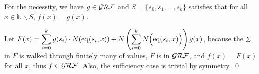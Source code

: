 
\begin{pf} \rm
 For the necessity, we have $g\in\mathcal{GRF}$ and
 $S=\{s_0,s_1,\ldots,s_k\}$ satisfies that
 for all $x\in\mathbb{N}\mathop{\backslash} S$, $f(x) = g(x)$.
 
 Let $\displaystyle F(x) = \sum_{i=0}^{k} g(s_i)\cdot N(\mathrm{eq}(s_i, x))
 + N\left( \sum_{i=0}^{k} N\Big(\mathrm{eq}(s_i, x)\Big) \right) g(x)$,
 because the $\Sigma$ in $F$ is walked through finitely many of values,
 $F$ is in $\mathcal{GRF}$, and $f(x)=F(x)$ for all $x$, thus $f\in\mathcal{GRF}$.
 Also, the sufficiency case is trivial by symmetry. \qed
\end{pf}
